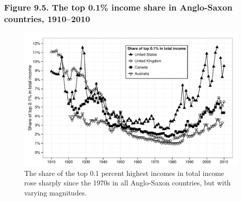 \documentclass[t]{beamer}\usepackage[]{graphicx}\usepackage[]{color}
\newenvironment{knitrout}{}{} %
\begin{document}
\begin{frame}[label=Figure_9_5]
\frametitle{Figure 9.5. The top 0.1\% income share in Anglo-Saxon countries, 1910--2010}
\begin{figure}[t]
\begin{minipage}[b]{\textwidth}
\centering
\begin{knitrout}\footnotesize
{}\color{fgcolor}

{\centering \includegraphics[width=1\linewidth]{figures/bw/Figure_9_5} 

}



\end{knitrout}
\caption{The share of the top 0.1 percent highest incomes in total income rose sharply since the 1970s in all Anglo-Saxon countries, but with varying magnitudes.}
\end{minipage}
\end{figure}
\end{frame}
\end{document}
